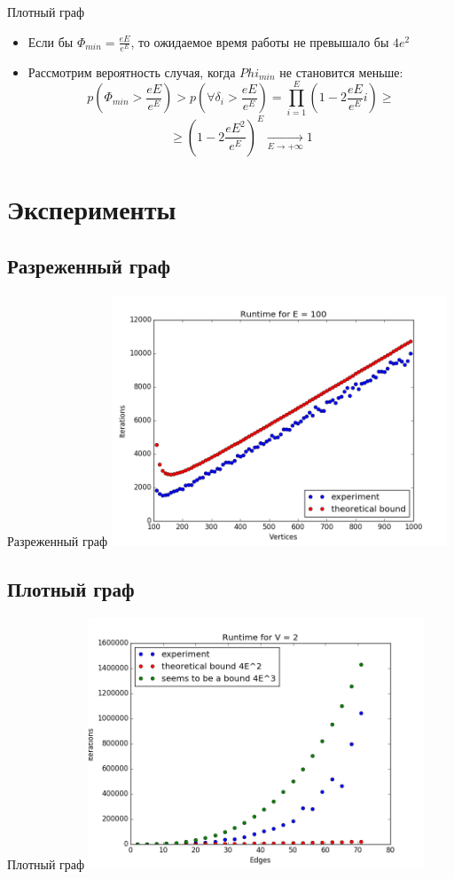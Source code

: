 \documentclass{beamer}
\begin{document}
 \begin{frame}{Плотный граф}
  \begin{itemize}
   \item Если бы $\Phi_{min} = \frac{eE}{e^E}$, то ожидаемое время работы не превышало бы $4e^2$
   \item Рассмотрим вероятность случая, когда $Phi_{min}$ не становится меньше:
   $$p\left(\Phi_{min} > \frac{eE}{e^E}\right) > p\left(\forall \delta_i > \frac{eE}{e^E}\right) = \prod_{i=1}^E (1 - 2 \frac{eE}{e^E}i) \ge$$
   $$\ge (1 - 2 \frac{eE^2}{e^E})^E \xrightarrow[E \to +\infty]{} 1 $$
  \end{itemize}
 \end{frame}
 
 \section{Эксперименты}
 \subsection{Разреженный граф}
 \begin{frame}{Разреженный граф}
  \includegraphics[width=10cm]{pic/rarefied_graph.png}
 \end{frame}
 
 \subsection{Плотный граф}
 \begin{frame}{Плотный граф}
   \includegraphics[width=10cm]{pic/dense_graph.png}
 \end{frame}
\end{document}
